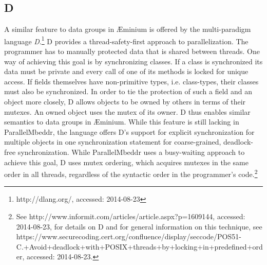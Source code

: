 \subsection{D}
A similar feature to data groups in \AE minium is offered by the multi-paradigm language \textit{D}.\footnote{http://dlang.org/, accessed: 2014-08-23} D provides a thread-safety-first approach to parallelization. The programmer has to manually protected data that is shared between threads. One way of achieving this goal is by synchronizing classes. If a class is synchronized its data must be private and every call of one of its methods is locked for unique access. If fields themselves have non-primitive types, i.e. class-types, their classes must also be synchronized. In order to tie the protection of such a field and an object more closely, D allows objects to be owned by others in terms of their mutexes. An owned object uses the mutex of its owner. D thus enables similar semantics to data groups in \AE minium. While this feature is still lacking in ParallelMbeddr, the language offers D's support for explicit synchronization for multiple objects in one synchronization statement for coarse-grained, deadlock-free synchronization. While ParallelMbeddr uses a busy-waiting approach to achieve this goal, D uses mutex ordering, which acquires mutexes in the same order in all threads, regardless of the syntactic order in the programmer's code.\footnote{See http://www.informit.com/articles/article.aspx?p=1609144, accessed: 2014-08-23, for details on D and for general information on this technique, see https://www.securecoding.cert.org/confluence/display/seccode/POS51-C.+Avoid+deadlock+with+POSIX+threads+by+locking+in+predefined+order, accessed: 2014-08-23.}

